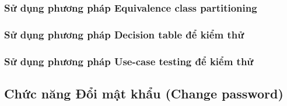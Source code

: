 \documentclass[a4paper, 12pt]{article}
\begin{document}
\subsubsection{Sử dụng phương pháp Equivalence class partitioning}
\subsubsection{Sử dụng phương pháp Decision table để kiểm thử}
\subsubsection{Sử dụng phương pháp Use-case testing để kiểm thử}

\subsection{Chức năng Đổi mật khẩu (Change password)}
\end{document}
